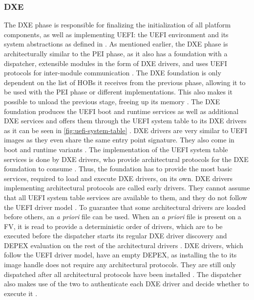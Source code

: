 \subsubsection{\acf{DXE}}

The \ac{DXE} phase is responsible for finalizing the initialization of all platform components, as well as implementing \ac{UEFI}: the \ac{UEFI} environment and its system abstractions as defined in \cite{uefi-spec}.
As mentioned earlier, the \ac{DXE} phase is architecturally similar to the \ac{PEI} phase, as it also has a foundation with a dispatcher, extensible modules in the form of \ac{DXE} drivers, and uses \ac{UEFI} protocols for inter-module communication \citep[Vol. 2, 2.1]{pi-spec}.
The \ac{DXE} foundation is only dependent on the list of \acp{HOB} it receives from the previous phase, allowing it to be used with the \ac{PEI} phase or different implementations.
This also makes it possible to unload the previous stage, freeing up its memory \cite[Vol. 2, 9.1]{pi-spec}.
The \ac{DXE} foundation produces the \ac{UEFI} boot and runtime services as well as additional \ac{DXE} services and offers them through the \ac{UEFI} system table to its \ac{DXE} drivers as it can be seen in \autoref{fig:uefi-system-table} \cite[Vol. 2, 2.2.1]{pi-spec}.
\ac{DXE} drivers are very similar to \ac{UEFI} images as they even share the same entry point signature.
They also come in boot and runtime variants \cite[Vol. 2, 11.2.3]{pi-spec}.
The implementation of the \ac{UEFI} system table services is done by \ac{DXE} drivers, who provide architectural protocols for the \ac{DXE} foundation to consume \cite[Vol. 2, 12.1]{pi-spec}.
Thus, the foundation has to provide the most basic services, required to load and execute \ac{DXE} drivers, on its own.
\ac{DXE} drivers implementing architectural protocols are called early drivers.
They cannot assume that all \ac{UEFI} system table services are available to them, and they do not follow the \ac{UEFI} driver model \cite[Vol. 2, 11.2.1]{pi-spec}.
To guarantee that some architectural drivers are loaded before others, an \emph{a priori} file can be used.
When an \emph{a priori} file is present on a \ac{FV}, it is read to provide a deterministic order of drivers, which are to be executed before the dispatcher starts its regular \ac{DXE} driver discovery and \ac{DEPEX} evaluation on the rest of the architectural drivers \cite[Vol. 2, 10.3]{pi-spec}.
\ac{DXE} drivers, which follow the \ac{UEFI} driver model, have an empty \ac{DEPEX}, as installing the  to its image handle does not require any architectural protocols.
They are still only dispatched after all architectural protocols have been installed \cite[Vol. 2, 11.2.2]{pi-spec}.
The dispatcher also makes use of the two  to authenticate each \ac{DXE} driver and decide whether to execute it \cite[Vol. 2, 10.13]{pi-spec}.

